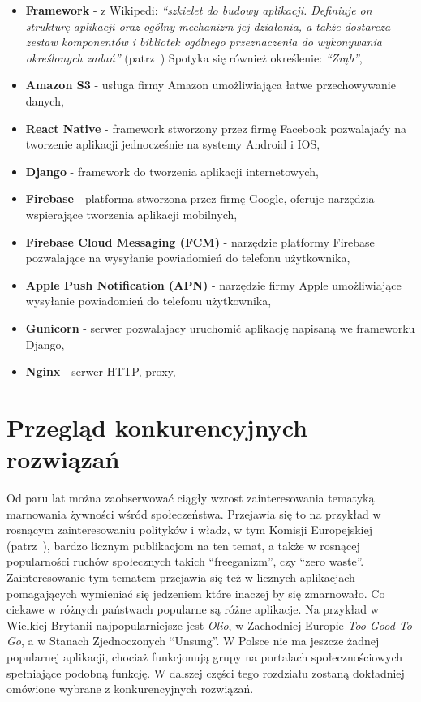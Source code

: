 \documentclass[licencjacka]{pracamgr}
\begin{document}
\begin{itemize}
\setlength\itemsep{-0.2em}

\item \textbf{Framework} - z Wikipedi: \textit{``szkielet do budowy aplikacji. Definiuje on strukturę aplikacji oraz ogólny mechanizm jej działania, a także dostarcza zestaw komponentów i bibliotek ogólnego przeznaczenia do wykonywania określonych zadań''} (patrz~\cite{framework}) Spotyka się również określenie: \textit{``Zrąb''},

\item \textbf{Amazon S3} - usługa firmy Amazon umożliwiająca łatwe przechowywanie danych,

\item \textbf{React Native} - framework stworzony przez firmę Facebook pozwalajaćy na tworzenie
aplikacji jednocześnie na systemy Android i IOS,

\item \textbf{Django} - framework do tworzenia aplikacji internetowych,

\item \textbf{Firebase} - platforma stworzona przez firmę Google, oferuje narzędzia wspierające tworzenia aplikacji mobilnych, 

\item \textbf{Firebase Cloud Messaging (FCM)} - narzędzie platformy Firebase pozwalające na wysyłanie powiadomień do telefonu użytkownika,

\item \textbf{Apple Push Notification (APN)} - narzędzie firmy Apple umożliwiające wysyłanie powiadomień do telefonu użytkownika,

\item \textbf{Gunicorn} - serwer pozwalajacy uruchomić aplikację napisaną we frameworku Django,

\item \textbf{Nginx} - serwer HTTP, proxy,


\end{itemize}

\chapter{Przegląd konkurencyjnych rozwiązań}\label{r:konkurencja}

Od paru lat można zaobserwować ciągły wzrost zainteresowania tematyką marnowania żywności wśród społeczeństwa. Przejawia się to na przykład w rosnącym zainteresowaniu polityków i władz, w tym Komisji Europejskiej (patrz~\cite{ec}), bardzo licznym publikacjom na ten temat, a także w rosnącej popularności ruchów społecznych takich ``freeganizm'', czy ``zero waste''. Zainteresowanie tym tematem przejawia się też w licznych aplikacjach pomagających wymieniać się jedzeniem które inaczej by się zmarnowało. Co ciekawe w różnych państwach popularne są różne aplikacje. Na przykład w Wielkiej Brytanii najpopularniejsze jest \textit{Olio}, w Zachodniej Europie \textit{Too Good To Go}, a w Stanach Zjednoczonych ``Unsung''. W Polsce nie ma jeszcze żadnej popularnej aplikacji, chociaż funkcjonują grupy na portalach społecznościowych spełniające podobną funkcję. W dalszej części tego rozdziału zostaną dokładniej omówione wybrane z konkurencyjnych rozwiązań.
\end{document}
